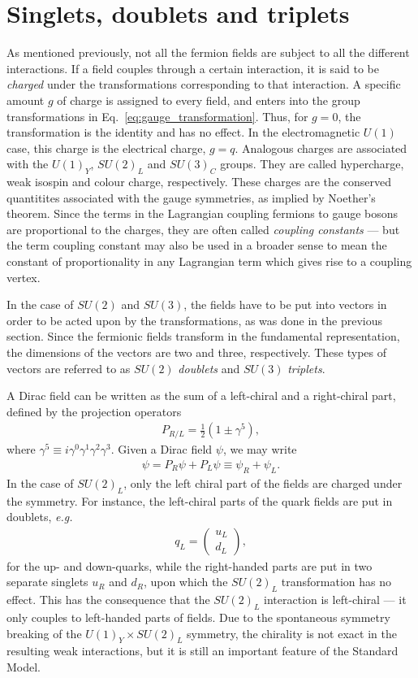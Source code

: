 \documentclass[twoside,english]{uiofysmaster}
\begin{document}
\section{Singlets, doublets and triplets}

As mentioned previously, not all the fermion fields are subject to all the different interactions. If a field couples through a certain interaction, it is said to be {\it charged} under the transformations corresponding to that interaction. A specific amount $g$ of charge is assigned to every field, and enters into the group transformations in Eq.\ \eqref{eq:gauge_transformation}. Thus, for $g=0$, the transformation is the identity and has no effect. In the electromagnetic $U(1)$ case, this charge is the electrical charge, $g=q$. Analogous charges are associated with the $U(1)_Y$, $SU(2)_L$ and $SU(3)_C$ groups. They are called hypercharge, weak isospin and colour charge, respectively. These charges are the conserved quantitites associated with the gauge symmetries, as implied by Noether's theorem. Since the terms in the Lagrangian coupling fermions to gauge bosons are proportional to the charges, they are often called {\it coupling constants} --- but the term coupling constant may also be used in a broader sense to mean the constant of proportionality in any Lagrangian term which gives rise to a coupling vertex.

In the case of $SU(2)$ and $SU(3)$, the fields have to be put into vectors in order to be acted upon by the transformations, as was done in the previous section. Since the fermionic fields transform in the fundamental representation, the dimensions of the vectors are two and three, respectively. These types of vectors are referred to as $SU(2)$ {\it doublets} and $SU(3)$ {\it triplets}.

A Dirac field can be written as the sum of a left-chiral and a right-chiral part, defined by the projection operators 
\begin{align}
	P_{R/L} = \frac{1}{2}\left( 1\pm \gamma^5 \right),
\end{align}
where $\gamma^5 \equiv i\gamma^0\gamma^1\gamma^2\gamma^3$. Given a Dirac field $\psi$, we may write
\begin{align}
	\psi = P_R \psi + P_L \psi \equiv \psi_R + \psi_L.
\end{align}
In the case of $SU(2)_L$, only the left chiral part of the fields are charged under the symmetry. For instance, the left-chiral parts of the quark fields are put in doublets, {\it e.g.}\
\begin{align}
	q_L = \begin{pmatrix}
		u_L \\ d_L
	\end{pmatrix},
\end{align}
for the up- and down-quarks, while the right-handed parts are put in two separate singlets $u_R$ and $d_R$, upon which the $SU(2)_L$ transformation has no effect. This has the consequence that the $SU(2)_L$ interaction is left-chiral --- it only couples to left-handed parts of fields. Due to the spontaneous symmetry breaking of the $U(1)_Y\times SU(2)_L$ symmetry, the chirality is not exact in the resulting weak interactions, but it is still an important feature of the Standard Model.
\end{document}
